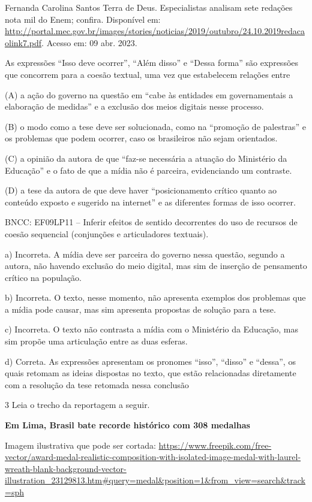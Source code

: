 \begin{itemize}
\begin{itemize}
{\begin{itemize}
\begin{itemize}
Fernanda Carolina Santos Terra de Deus. Especialistas analisam sete
redações nota mil do Enem; confira. Disponível em:
\url{http://portal.mec.gov.br/images/stories/noticias/2019/outubro/24.10.2019redacaolink7.pdf}.
Acesso em: 09 abr. 2023.

As expressões ``Isso deve ocorrer'', ``Além disso'' e ``Dessa forma''
são expressões que concorrem para a coesão textual, uma vez que
estabelecem relações entre

(A) a ação do governo na questão em ``cabe às entidades em
governamentais a elaboração de medidas'' e a exclusão dos meios digitais
nesse processo.

(B) o modo como a tese deve ser solucionada, como na ``promoção de
palestras'' e os problemas que podem ocorrer, caso os brasileiros não
sejam orientados.

(C) a opinião da autora de que ``faz-se necessária a atuação do
Ministério da Educação'' e o fato de que a mídia não é parceira,
evidenciando um contraste.

(D) a tese da autora de que deve haver ``posicionamento crítico quanto
ao conteúdo exposto e sugerido na internet'' e as diferentes formas de
isso ocorrer.

BNCC: EF09LP11 -- Inferir efeitos de sentido decorrentes do uso de
recursos de coesão sequencial (conjunções e articuladores textuais).

a) Incorreta. A mídia deve ser parceira do governo nessa questão,
segundo a autora, não havendo exclusão do meio digital, mas sim de
inserção de pensamento crítico na população.

b) Incorreta. O texto, nesse momento, não apresenta exemplos dos
problemas que a mídia pode causar, mas sim apresenta propostas de
solução para a tese.

c) Incorreta. O texto não contrasta a mídia com o Ministério da
Educação, mas sim propõe uma articulação entre as duas esferas.

d) Correta. As expressões apresentam os pronomes ``isso'', ``disso'' e
``dessa'', os quais retomam as ideias dispostas no texto, que estão
relacionadas diretamente com a resolução da tese retomada nessa
conclusão

\num{3} Leia o trecho da reportagem a seguir.

\textbf{Em Lima, Brasil bate recorde histórico com 308 medalhas}

Imagem ilustrativa que pode ser cortada:
\url{https://www.freepik.com/free-vector/award-medal-realistic-composition-with-isolated-image-medal-with-laurel-wreath-blank-background-vector-illustration_23129813.htm\#query=medal\&position=1\&from_view=search\&track=sph}


\end{itemize}
\end{itemize}}
\end{itemize}
\end{itemize}
